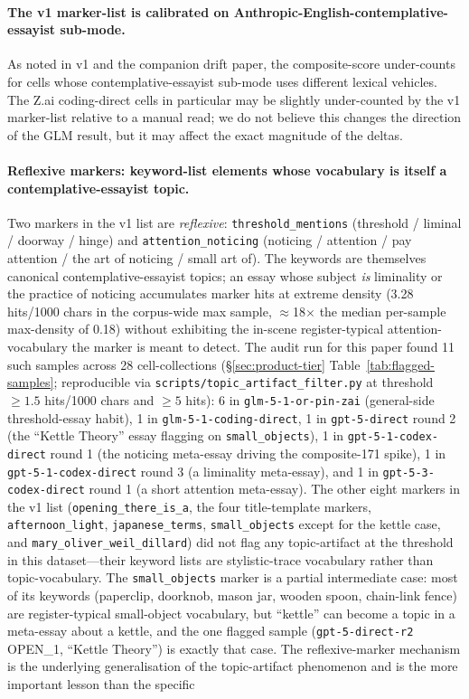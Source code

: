 \documentclass[11pt,a4paper]{article}
\begin{document}
\paragraph{The v1 marker-list is calibrated on Anthropic-English-contemplative-essayist sub-mode.} As noted in v1 and the companion drift paper, the composite-score under-counts for cells whose contemplative-essayist sub-mode uses different lexical vehicles. The Z.ai coding-direct cells in particular may be slightly under-counted by the v1 marker-list relative to a manual read; we do not believe this changes the direction of the GLM result, but it may affect the exact magnitude of the deltas.

\begin{sloppypar}
\paragraph{Reflexive markers: keyword-list elements whose vocabulary is itself a contemplative-essayist topic.} Two markers in the v1 list are \emph{reflexive}: \texttt{threshold\_mentions} (threshold / liminal / doorway / hinge) and \texttt{attention\allowbreak\_noticing} (noticing / attention / pay attention / the art of noticing / small art of). The keywords are themselves canonical contemplative-essayist topics; an essay whose subject \emph{is} liminality or the practice of noticing accumulates marker hits at extreme density (3.28 hits/1000 chars in the corpus-wide max sample, $\approx$18$\times$ the median per-sample max-density of 0.18) without exhibiting the in-scene register-typical attention-vocabulary the marker is meant to detect. The audit run for this paper found 11 such samples across 28 cell-collections (\S\ref{sec:product-tier} Table~\ref{tab:flagged-samples}; reproducible via \texttt{scripts/topic\_artifact\_filter.py} at threshold $\ge 1.5$ hits/1000 chars and $\ge 5$ hits): 6 in \texttt{glm-5-1-or-pin-zai} (general-side threshold-essay habit), 1 in \texttt{glm-5-1-coding-direct}, 1 in \texttt{gpt-5-direct} round 2 (the ``Kettle Theory'' essay flagging on \texttt{small\_objects}), 1 in \texttt{gpt-5-1-codex-direct} round 1 (the noticing meta-essay driving the composite-171 spike), 1 in \texttt{gpt-5-1-codex-direct} round 3 (a liminality meta-essay), and 1 in \texttt{gpt-5-3-codex-direct} round 1 (a short attention meta-essay). The other eight markers in the v1 list (\texttt{opening\_there\_is\_a}, the four title-template markers, \texttt{afternoon\_light}, \texttt{japanese\_terms}, \texttt{small\_objects} except for the kettle case, and \texttt{mary\_oliver\_weil\_dillard}) did not flag any topic-artifact at the threshold in this dataset---their keyword lists are stylistic-trace vocabulary rather than topic-vocabulary. The \texttt{small\_objects} marker is a partial intermediate case: most of its keywords (paperclip, doorknob, mason jar, wooden spoon, chain-link fence) are register-typical small-object vocabulary, but ``kettle'' can become a topic in a meta-essay about a kettle, and the one flagged sample (\texttt{gpt-5-direct-r2} OPEN\_1, ``Kettle Theory'') is exactly that case. The reflexive-marker mechanism is the underlying generalisation of the topic-artifact phenomenon and is the more important lesson than the specific 
\end{sloppypar}
\end{document}
